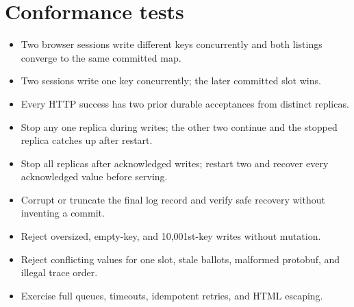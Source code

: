 \hypertarget{conformance-tests}{%
\section{Conformance tests}\label{conformance-tests}}

\begin{itemize}
\tightlist
\item
  Two browser sessions write different keys concurrently and both
  listings converge to the same committed map.
\item
  Two sessions write one key concurrently; the later committed slot
  wins.
\item
  Every HTTP success has two prior durable acceptances from distinct
  replicas.
\item
  Stop any one replica during writes; the other two continue and the
  stopped replica catches up after restart.
\item
  Stop all replicas after acknowledged writes; restart two and recover
  every acknowledged value before serving.
\item
  Corrupt or truncate the final log record and verify safe recovery
  without inventing a commit.
\item
  Reject oversized, empty-key, and 10,001st-key writes without mutation.
\item
  Reject conflicting values for one slot, stale ballots, malformed
  protobuf, and illegal trace order.
\item
  Exercise full queues, timeouts, idempotent retries, and HTML escaping.
\end{itemize}
